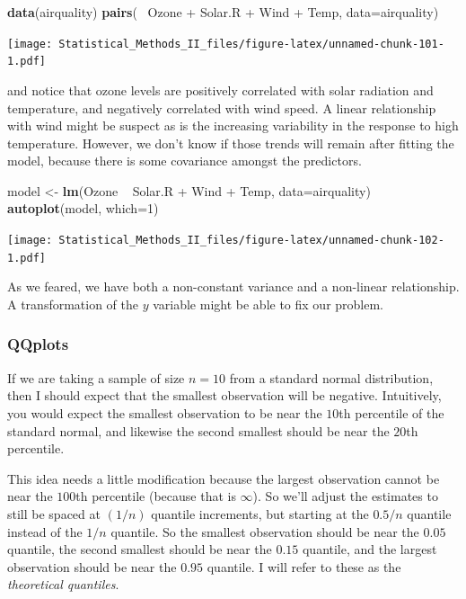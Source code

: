 \documentclass[]{book}
\newenvironment{Shaded}{\begin{snugshade}}{\end{snugshade}}
\newcommand{\KeywordTok}[1]{\textcolor[rgb]{0.13,0.29,0.53}{\textbf{{#1}}}}
\newcommand{\DataTypeTok}[1]{\textcolor[rgb]{0.13,0.29,0.53}{{#1}}}
\newcommand{\DecValTok}[1]{\textcolor[rgb]{0.00,0.00,0.81}{{#1}}}
\newcommand{\StringTok}[1]{\textcolor[rgb]{0.31,0.60,0.02}{{#1}}}
\newcommand{\NormalTok}[1]{{#1}}
\theoremstyle{definition}
\theoremstyle{definition}
\theoremstyle{remark}
\begin{document}
\begin{Shaded}
\begin{Highlighting}[]
\KeywordTok{data}\NormalTok{(airquality)}
\KeywordTok{pairs}\NormalTok{(~}\StringTok{ }\NormalTok{Ozone +}\StringTok{ }\NormalTok{Solar.R +}\StringTok{ }\NormalTok{Wind +}\StringTok{ }\NormalTok{Temp, }\DataTypeTok{data=}\NormalTok{airquality)}
\end{Highlighting}
\end{Shaded}

\texttt{[image: Statistical\_Methods\_II\_files/figure-latex/unnamed-chunk-101-1.pdf]}

and notice that ozone levels are positively correlated with solar
radiation and temperature, and negatively correlated with wind speed. A
linear relationship with wind might be suspect as is the increasing
variability in the response to high temperature. However, we don't know
if those trends will remain after fitting the model, because there is
some covariance amongst the predictors.

\begin{Shaded}
\begin{Highlighting}[]
\NormalTok{model <-}\StringTok{ }\KeywordTok{lm}\NormalTok{(Ozone ~}\StringTok{ }\NormalTok{Solar.R +}\StringTok{ }\NormalTok{Wind +}\StringTok{ }\NormalTok{Temp, }\DataTypeTok{data=}\NormalTok{airquality)}
\KeywordTok{autoplot}\NormalTok{(model, }\DataTypeTok{which=}\DecValTok{1}\NormalTok{) }
\end{Highlighting}
\end{Shaded}

\texttt{[image: Statistical\_Methods\_II\_files/figure-latex/unnamed-chunk-102-1.pdf]}

As we feared, we have both a non-constant variance and a non-linear
relationship. A transformation of the \(y\) variable might be able to
fix our problem.

\subsubsection{QQplots}\label{qqplots}

If we are taking a sample of size \(n=10\) from a standard normal
distribution, then I should expect that the smallest observation will be
negative. Intuitively, you would expect the smallest observation to be
near the \(10\)th percentile of the standard normal, and likewise the
second smallest should be near the \(20\)th percentile.

This idea needs a little modification because the largest observation
cannot be near the \(100\)th percentile (because that is \(\infty\)). So
we'll adjust the estimates to still be spaced at \((1/n)\) quantile
increments, but starting at the \(0.5/n\) quantile instead of the
\(1/n\) quantile. So the smallest observation should be near the
\(0.05\) quantile, the second smallest should be near the \(0.15\)
quantile, and the largest observation should be near the \(0.95\)
quantile. I will refer to these as the \emph{theoretical quantiles}.
\end{document}
